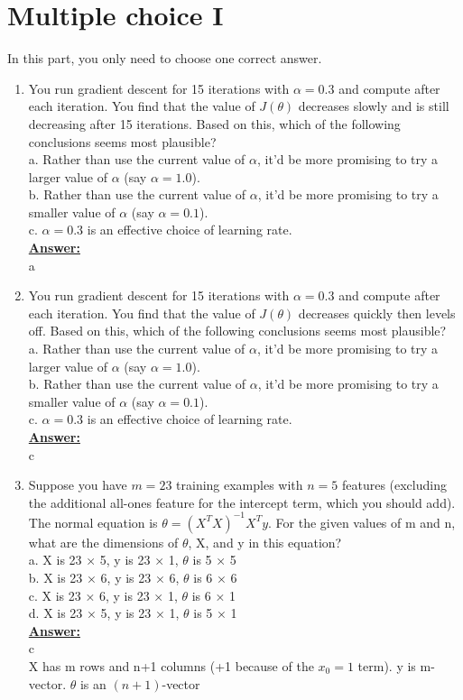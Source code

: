 \documentclass{article}
\newenvironment{qparts}{\begin{enumerate}[1.]}{\end{enumerate}}
\begin{document}
\section{Multiple choice I}
In this part, you only need to choose one correct answer.
\begin{qparts}
\item You run gradient descent for 15 iterations with $\alpha = 0.3$ and compute after each iteration. You find that the value of $J(\theta)$ decreases slowly and is still decreasing after 15 iterations. Based on this, which of the following conclusions seems most plausible?\\
 a. Rather than use the current value of  $\alpha$, it’d be more promising to try a larger value of $\alpha$ (say $\alpha = 1.0$).\\
 b. Rather than use the current value of $\alpha$, it’d be more promising to try a smaller value of $\alpha$ (say $\alpha = 0.1$).\\
 c. $\alpha = 0.3$ is an effective choice of learning rate.\\
\underline{\textbf{Answer:}}\\
a
\item You run gradient descent for 15 iterations with $\alpha = 0.3$ and compute after each iteration. You find that the value of $J(\theta)$ decreases quickly then levels off. Based on this, which of the following conclusions seems most plausible?\\
 a. Rather than use the current value of  $\alpha$, it’d be more promising to try a larger value of $\alpha$ (say $\alpha = 1.0$).\\
 b. Rather than use the current value of $\alpha$, it’d be more promising to try a smaller value of $\alpha$ (say $\alpha = 0.1$).\\
 c. $\alpha = 0.3$ is an effective choice of learning rate.\\
\underline{\textbf{Answer:}}\\
c

\item Suppose you have $m = 23$ training examples with $n = 5$ features (excluding the additional all-ones feature for the intercept term, which you should add). The normal equation is $\theta = (X^{T} X)^{-1}X^{T}y$. For the given values of m and n, what are the dimensions of $\theta$, X, and y in this equation?\\
a. X is 23 × 5, y is 23 × 1, $\theta$ is 5 × 5\\
b. X is 23 × 6, y is 23 × 6, $\theta$ is 6 × 6\\
c. X is 23 × 6, y is 23 × 1, $\theta$ is 6 × 1\\
d. X is 23 × 5, y is 23 × 1, $\theta$ is 5 × 1\\
\underline{\textbf{Answer:}}\\
c\\
 X has m rows and n+1 columns (+1 because of the $x_0=1$ term). y is m-vector. $\theta$ is an $(n+1)$-vector



\end{qparts}
\end{document}
